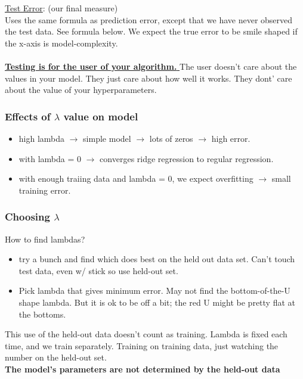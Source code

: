 \underline{Test Error}: (our final measure)  \hfill \\
Uses the same formula as prediction error, except that we have never observed the test data.  See formula below. 
We expect the true error to be smile shaped if the x-axis is model-complexity. 
\hfill \\ \hfill \\

\underline{\textbf{Testing is for the user of your algorithm. }}
The user doesn't care about the values in your model.  They just care about how well it works.  
 They dont' care about the value of your hyperparameters. 


\subsubsection{Effects of $\lambda$ value on model}
 \begin{itemize}
 	\item high lambda $\rightarrow$ simple model $\rightarrow$ lots of zeros $\rightarrow$ high error. 
	\item with lambda = 0 $\rightarrow$ converges ridge regression to regular regression. 
	\item with enough traiing data and lambda = 0, we expect overfitting $\rightarrow$ small training error. 
\end{itemize}

\subsubsection{Choosing $\lambda$}
How to find lambdas? 
\begin{itemize}
	\item try a bunch and find which does best on the held out data set.  
		Can't touch test data, even w/ stick so use held-out set. 
	\item Pick lambda that gives minimum error.
		May not find the bottom-of-the-U shape lambda.  
		But it is ok to be off a bit; the red U might be pretty flat at the bottoms.
\end{itemize}		
This use of the held-out data doesn't count as training.  
Lambda is fixed each time, and we train separately. 
Training on training data, just watching the number on the held-out set. \hfill \\
\textbf{The model's parameters are not determined by the held-out data} \hfill \\
\hfill \\

